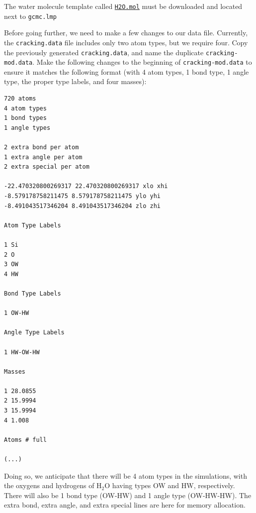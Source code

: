 \documentclass[9pt,tutorial]{livecoms}
\newcommand{\lmpcmd}[1]{\hspace{0pt}\colorbox{listing}{\textcolor{command}{\small{#1}}}\hspace{0pt}} %
\newcommand{\flecmd}[1]{\textcolor{command}{\texttt{#1}}} %
\newcommand{\dwlcmd}[1]{\textcolor{download}{\texttt{#1}}} %
\newcommand{\filepath}{https://raw.githubusercontent.com/lammpstutorials/lammpstutorials-article/main/files/}
\begin{document}
The water molecule template called \href{\filepath tutorial6/H2O.mol}{\dwlcmd{H2O.mol}}
must be downloaded and located next to \flecmd{gcmc.lmp}

Before going further, we need to make a few changes to our data file.
Currently, the \flecmd{cracking.data} file includes only two atom types, but we require four.
Copy the previously generated \flecmd{cracking.data}, and name the duplicate \flecmd{cracking-mod.data}.
Make the following changes to the beginning of \flecmd{cracking-mod.data}
to ensure it matches the following format (with 4 atom types,
1 bond type, 1 angle type, the proper type labels, and four masses):
\begin{lstlisting}
720 atoms
4 atom types
1 bond types
1 angle types

2 extra bond per atom
1 extra angle per atom
2 extra special per atom

-22.470320800269317 22.470320800269317 xlo xhi
-8.579178758211475 8.579178758211475 ylo yhi
-8.491043517346204 8.491043517346204 zlo zhi

Atom Type Labels

1 Si
2 O
3 OW
4 HW

Bond Type Labels

1 OW-HW

Angle Type Labels

1 HW-OW-HW

Masses

1 28.0855
2 15.9994
3 15.9994
4 1.008

Atoms # full

(...)
\end{lstlisting}
Doing so, we anticipate that there will be 4 atom types in the simulations,
with the oxygens and hydrogens of $\text{H}_2\text{O}$ having
types \lmpcmd{OW} and \lmpcmd{HW}, respectively.  There
will also be 1 bond type (\lmpcmd{OW-HW}) and 1 angle type (\lmpcmd{OW-HW-HW}).
The \lmpcmd{extra bond}, \lmpcmd{extra angle}, and
\lmpcmd{extra special} lines are here for memory allocation.
\end{document}
